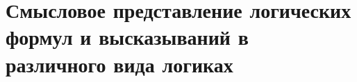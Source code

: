 \chapter{Смысловое представление логических формул и высказываний в различного вида логиках}
\label{chapter_logic}




%